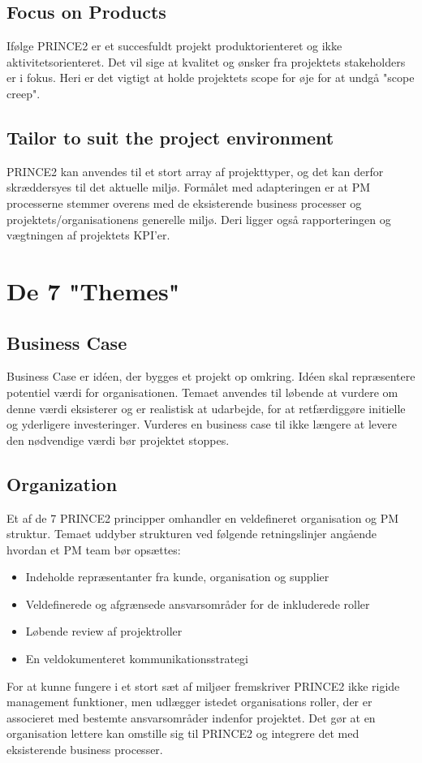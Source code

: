 \documentclass[12pt,twoside]{article}
\begin{document}
    \subsection{Focus on Products}
    Ifølge PRINCE2 er et succesfuldt projekt produktorienteret og ikke aktivitetsorienteret. Det vil sige at kvalitet og ønsker fra projektets stakeholders er i fokus. Heri er det vigtigt at holde projektets scope for øje for at undgå "scope creep".

    \subsection{Tailor to suit the project environment}
    PRINCE2 kan anvendes til et stort array af projekttyper, og det kan derfor skræddersyes til det aktuelle miljø. Formålet med adapteringen er at PM processerne stemmer overens med de eksisterende business processer og projektets/organisationens generelle miljø. Deri ligger også rapporteringen og vægtningen af projektets KPI'er.
    \newpage

    \section{De 7 "Themes"}

    \subsection{Business Case}
    \label{sec:business_case}
    Business Case er idéen, der bygges et projekt op omkring. Idéen skal repræsentere potentiel værdi for organisationen. Temaet anvendes til løbende at vurdere om denne værdi eksisterer og er realistisk at udarbejde, for at retfærdiggøre initielle og yderligere investeringer. Vurderes en business case til ikke længere at levere den nødvendige værdi bør projektet stoppes.

    \subsection{Organization}
    Et af de 7 PRINCE2 principper omhandler en veldefineret organisation og PM struktur. Temaet uddyber strukturen ved følgende retningslinjer angående hvordan et PM team bør opsættes:
    \begin{itemize}
        \item Indeholde repræsentanter fra kunde, organisation og supplier
        \item Veldefinerede og afgrænsede ansvarsområder for de inkluderede roller
        \item Løbende review af projektroller
        \item En veldokumenteret kommunikationsstrategi
    \end{itemize}
    For at kunne fungere i et stort sæt af miljøer fremskriver PRINCE2 ikke rigide management funktioner, men udlægger istedet organisations roller, der er associeret med bestemte ansvarsområder indenfor projektet. Det gør at en organisation lettere kan omstille sig til PRINCE2 og integrere det med eksisterende business processer.
\end{document}
